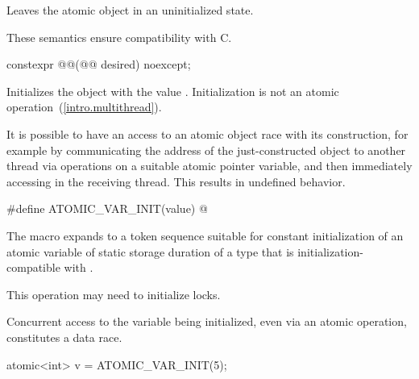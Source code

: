 \begin{itemdescr}
\pnum
\effects
Leaves the atomic object in an uninitialized state.
\begin{note}
These semantics ensure compatibility with C.
\end{note}
\end{itemdescr}

%
%
%
\begin{itemdecl}
constexpr @@(@@ desired) noexcept;
\end{itemdecl}

\begin{itemdescr}
\pnum
\effects Initializes the object with the value .
Initialization is not an atomic operation~(\ref{intro.multithread}).
\begin{note} It is possible to have an access to an atomic object 
race with its construction, for example by communicating the address of the
just-constructed object  to another thread via
 operations on a suitable atomic pointer
variable, and then immediately accessing  in the receiving thread.
This results in undefined behavior. \end{note}
\end{itemdescr}

%
\begin{itemdecl}
#define ATOMIC_VAR_INIT(value) @\seebelow@
\end{itemdecl}

\begin{itemdescr}
\pnum
The macro expands to a token sequence suitable for
constant initialization of
an atomic variable of static storage duration of a type that is
initialization-compatible with .
\begin{note} This operation may need to initialize locks. \end{note}
Concurrent access to the variable being initialized, even via an atomic operation,
constitutes a data race. \begin{example}
\begin{codeblock}
atomic<int> v = ATOMIC_VAR_INIT(5);
\end{codeblock}
\end{example}
\end{itemdescr}

